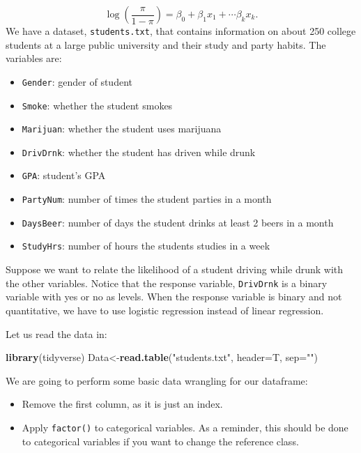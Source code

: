 \documentclass[
]{book}
\newenvironment{Shaded}{\begin{snugshade}}{\end{snugshade}}
\newcommand{\AttributeTok}[1]{\textcolor[rgb]{0.13,0.29,0.53}{#1}}
\newcommand{\FunctionTok}[1]{\textcolor[rgb]{0.13,0.29,0.53}{\textbf{#1}}}
\newcommand{\NormalTok}[1]{#1}
\newcommand{\OtherTok}[1]{\textcolor[rgb]{0.56,0.35,0.01}{#1}}
\newcommand{\StringTok}[1]{\textcolor[rgb]{0.31,0.60,0.02}{#1}}
\providecommand{\tightlist}{%
  \setlength{\itemsep}{0pt}\setlength{\parskip}{0pt}}
\begin{document}
\[
\log(\frac{\pi}{1-\pi}) = \beta_0 + \beta_1 x_1 + \cdots \beta_{k} x_{k}.
\]
We have a dataset, \texttt{students.txt}, that contains information on about 250 college students at a large public university and their study and party habits. The variables are:

\begin{itemize}
\tightlist
\item
  \texttt{Gender}: gender of student
\item
  \texttt{Smoke}: whether the student smokes
\item
  \texttt{Marijuan}: whether the student uses marijuana
\item
  \texttt{DrivDrnk}: whether the student has driven while drunk
\item
  \texttt{GPA}: student's GPA
\item
  \texttt{PartyNum}: number of times the student parties in a month
\item
  \texttt{DaysBeer}: number of days the student drinks at least 2 beers in a month
\item
  \texttt{StudyHrs}: number of hours the students studies in a week
\end{itemize}

Suppose we want to relate the likelihood of a student driving while drunk with the other variables. Notice that the response variable, \texttt{DrivDrnk} is a binary variable with yes or no as levels. When the response variable is binary and not quantitative, we have to use logistic regression instead of linear regression.

Let us read the data in:

\begin{Shaded}
\begin{Highlighting}[]
\FunctionTok{library}\NormalTok{(tidyverse)}
\NormalTok{Data}\OtherTok{\textless{}{-}}\FunctionTok{read.table}\NormalTok{(}\StringTok{"students.txt"}\NormalTok{, }\AttributeTok{header=}\NormalTok{T, }\AttributeTok{sep=}\StringTok{""}\NormalTok{)}
\end{Highlighting}
\end{Shaded}

We are going to perform some basic data wrangling for our dataframe:

\begin{itemize}
\tightlist
\item
  Remove the first column, as it is just an index.
\item
  Apply \texttt{factor()} to categorical variables. As a reminder, this should be done to categorical variables if you want to change the reference class.
\end{itemize}
\end{document}
